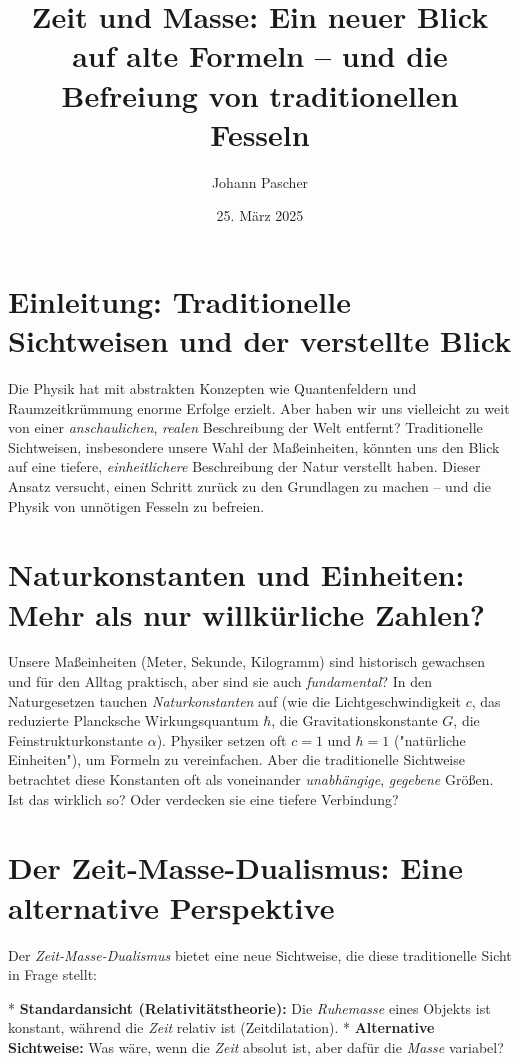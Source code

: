 \documentclass[a4paper,12pt]{article}
\title{Zeit und Masse: Ein neuer Blick auf alte Formeln – und die Befreiung von traditionellen Fesseln}
\author{Johann Pascher}
\date{25. März 2025}
\begin{document}
	\maketitle
	
	\section{Einleitung: Traditionelle Sichtweisen und der verstellte Blick}
	
	Die Physik hat mit abstrakten Konzepten wie Quantenfeldern und Raumzeitkrümmung enorme Erfolge erzielt. Aber haben wir uns vielleicht zu weit von einer \emph{anschaulichen}, \emph{realen} Beschreibung der Welt entfernt? Traditionelle Sichtweisen, insbesondere unsere Wahl der Maßeinheiten, könnten uns den Blick auf eine tiefere, \emph{einheitlichere} Beschreibung der Natur verstellt haben. Dieser Ansatz versucht, einen Schritt zurück zu den Grundlagen zu machen – und die Physik von unnötigen Fesseln zu befreien.
	
	\section{Naturkonstanten und Einheiten: Mehr als nur willkürliche Zahlen?}
	
	Unsere Maßeinheiten (Meter, Sekunde, Kilogramm) sind historisch gewachsen und für den Alltag praktisch, aber sind sie auch \emph{fundamental}? In den Naturgesetzen tauchen \emph{Naturkonstanten} auf (wie die Lichtgeschwindigkeit \(c\), das reduzierte Plancksche Wirkungsquantum \(\hbar\), die Gravitationskonstante \(G\), die Feinstrukturkonstante \(\alpha\)). Physiker setzen oft \(c = 1\) und \(\hbar = 1\) ("natürliche Einheiten"), um Formeln zu vereinfachen. Aber die traditionelle Sichtweise betrachtet diese Konstanten oft als voneinander \emph{unabhängige}, \emph{gegebene} Größen. Ist das wirklich so? Oder verdecken sie eine tiefere Verbindung?
	
	\section{Der Zeit-Masse-Dualismus: Eine alternative Perspektive}
	
	Der \emph{Zeit-Masse-Dualismus} bietet eine neue Sichtweise, die diese traditionelle Sicht in Frage stellt:
	
	*   \textbf{Standardansicht (Relativitätstheorie):} Die \emph{Ruhemasse} eines Objekts ist konstant, während die \emph{Zeit} relativ ist (Zeitdilatation).
	*   \textbf{Alternative Sichtweise:} Was wäre, wenn die \emph{Zeit} absolut ist, aber dafür die \emph{Masse} variabel?
	
\end{document}

